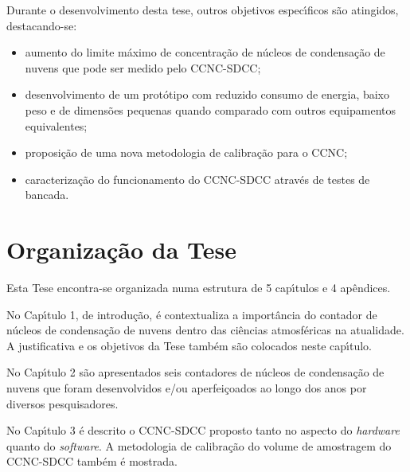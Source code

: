 Durante o desenvolvimento desta tese, outros objetivos espec\'{\i}ficos s\~{a}o atingidos, destacando-se:

\begin {itemize}

\item aumento do limite m\'{a}ximo de concentra\c{c}\~{a}o de n\'{u}cleos de condensa\c{c}\~{a}o de nuvens que pode ser medido pelo CCNC-SDCC;

\item desenvolvimento de um prot\'{o}tipo com reduzido consumo de energia, baixo peso e de dimens\~{o}es pequenas quando comparado com outros equipamentos equivalentes;

\item proposi\c{c}\~{a}o de uma nova metodologia de calibra\c{c}\~{a}o para o CCNC;

\item caracteriza\c{c}\~{a}o do funcionamento do CCNC-SDCC atrav\'{e}s de testes de bancada.

\end{itemize}

\section{Organiza\c{c}\~{a}o da Tese}
\label{sec:organizacao}

Esta Tese encontra-se organizada numa estrutura de 5 cap\'{\i}tulos e 4 ap\^{e}ndices.

 No Cap\'{\i}tulo 1, de introdu\c{c}\~{a}o, \'{e} contextualiza a import\^{a}ncia do contador de n\'{u}cleos de condensa\c{c}\~{a}o de nuvens dentro das ci\^{e}ncias atmosf\'{e}ricas na atualidade. A justificativa e os objetivos da Tese tamb\'{e}m s\~{a}o colocados neste cap\'{\i}tulo.

 No Cap\'{\i}tulo 2 s\~{a}o apresentados seis contadores de n\'{u}cleos de condensa\c{c}\~{a}o de nuvens que foram desenvolvidos e/ou aperfei\c{c}oados ao longo dos anos por diversos pesquisadores.

 No Cap\'{\i}tulo 3  \'{e} descrito o CCNC-SDCC proposto tanto no aspecto do \emph{hardware} quanto do \emph{software}. A metodologia de calibra\c{c}\~{a}o do volume de amostragem do CCNC-SDCC tamb\'{e}m \'{e} mostrada.

